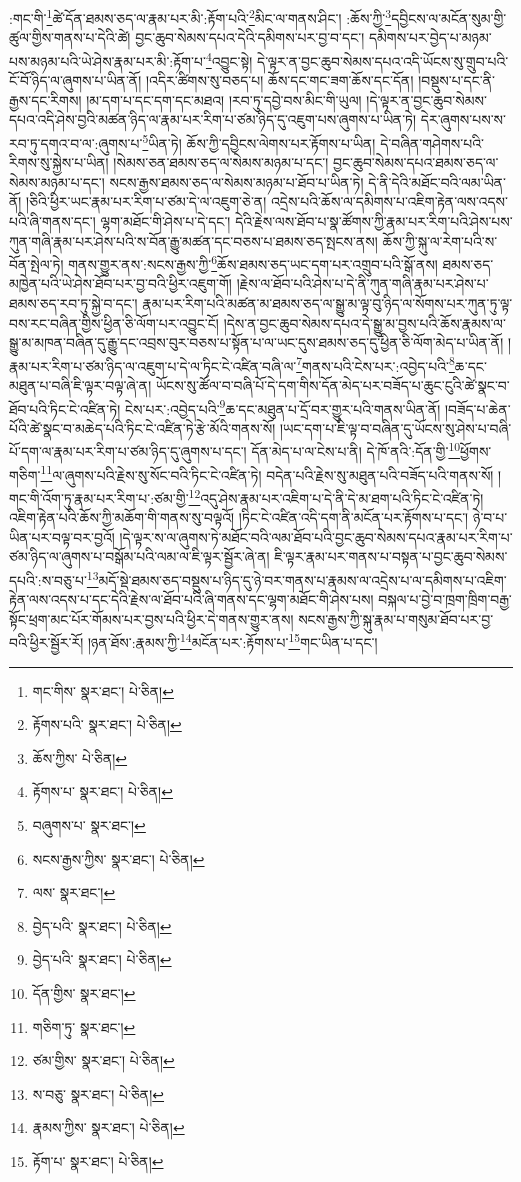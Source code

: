 :གང་གི་\footnote{གང་གིས་  སྣར་ཐང་།  པེ་ཅིན། }ཚེ་དོན་ཐམས་ཅད་ལ་རྣམ་པར་མི་:རྟོག་པའི་\footnote{རྟོགས་པའི་  སྣར་ཐང་།  པེ་ཅིན། }མིང་ལ་གནས་ཤིང་། :ཆོས་ཀྱི་\footnote{ཆོས་ཀྱིས་  པེ་ཅིན། }དབྱིངས་ལ་མངོན་སུམ་གྱི་ཚུལ་གྱིས་གནས་པ་དེའི་ཚེ། བྱང་ཆུབ་སེམས་དཔའ་དེའི་དམིགས་པར་བྱ་བ་དང་། དམིགས་པར་བྱེད་པ་མཉམ་པས་མཉམ་པའི་ཡེ་ཤེས་རྣམ་པར་མི་:རྟོག་པ་\footnote{རྟོགས་པ་  སྣར་ཐང་།  པེ་ཅིན། }འབྱུང་སྟེ། དེ་ལྟར་ན་བྱང་ཆུབ་སེམས་དཔའ་འདི་ཡོངས་སུ་གྲུབ་པའི་ངོ་བོ་ཉིད་ལ་ཞུགས་པ་ཡིན་ནོ། །འདིར་ཚིགས་སུ་བཅད་པ། ཆོས་དང་གང་ཟག་ཆོས་དང་དོན། །བསྡུས་པ་དང་ནི་རྒྱས་དང་རིགས། །མ་དག་པ་དང་དག་དང་མཐའ། །རབ་ཏུ་དབྱེ་བས་མིང་གི་ཡུལ། །དེ་ལྟར་ན་བྱང་ཆུབ་སེམས་དཔའ་འདི་ཤེས་བྱའི་མཚན་ཉིད་ལ་རྣམ་པར་རིག་པ་ཙམ་ཉིད་དུ་འཇུག་པས་ཞུགས་པ་ཡིན་ཏེ། དེར་ཞུགས་པས་ས་རབ་ཏུ་དགའ་བ་ལ་:ཞུགས་པ་\footnote{བཞུགས་པ་  སྣར་ཐང་། }ཡིན་ཏེ། ཆོས་ཀྱི་དབྱིངས་ལེགས་པར་རྟོགས་པ་ཡིན། དེ་བཞིན་གཤེགས་པའི་རིགས་སུ་སྐྱེས་པ་ཡིན། །སེམས་ཅན་ཐམས་ཅད་ལ་སེམས་མཉམ་པ་དང་། བྱང་ཆུབ་སེམས་དཔའ་ཐམས་ཅད་ལ་སེམས་མཉམ་པ་དང་། སངས་རྒྱས་ཐམས་ཅད་ལ་སེམས་མཉམ་པ་ཐོབ་པ་ཡིན་ཏེ། དེ་ནི་དེའི་མཐོང་བའི་ལམ་ཡིན་ནོ། །ཅིའི་ཕྱིར་ཡང་རྣམ་པར་རིག་པ་ཙམ་དེ་ལ་འཇུག་ཅེ་ན། འདྲེས་པའི་ཆོས་ལ་དམིགས་པ་འཇིག་རྟེན་ལས་འདས་པའི་ཞི་གནས་དང་། ལྷག་མཐོང་གི་ཤེས་པ་དེ་དང་། དེའི་རྗེས་ལས་ཐོབ་པ་སྣ་ཚོགས་ཀྱི་རྣམ་པར་རིག་པའི་ཤེས་པས་ཀུན་གཞི་རྣམ་པར་ཤེས་པའི་ས་བོན་རྒྱུ་མཚན་དང་བཅས་པ་ཐམས་ཅད་སྤངས་ནས། ཆོས་ཀྱི་སྐུ་ལ་རེག་པའི་ས་བོན་སྤེལ་ཏེ། གནས་གྱུར་ནས་:སངས་རྒྱས་ཀྱི་\footnote{སངས་རྒྱས་ཀྱིས་  སྣར་ཐང་།  པེ་ཅིན། }ཆོས་ཐམས་ཅད་ཡང་དག་པར་འགྲུབ་པའི་སྒོ་ནས། ཐམས་ཅད་མཁྱེན་པའི་ཡེ་ཤེས་ཐོབ་པར་བྱ་བའི་ཕྱིར་འཇུག་གོ། །རྗེས་ལ་ཐོབ་པའི་ཤེས་པ་དེ་ནི་ཀུན་གཞི་རྣམ་པར་ཤེས་པ་ཐམས་ཅད་རབ་ཏུ་སྐྱེ་བ་དང་། རྣམ་པར་རིག་པའི་མཚན་མ་ཐམས་ཅད་ལ་སྒྱུ་མ་ལྟ་བུ་ཉིད་ལ་སོགས་པར་ཀུན་ཏུ་ལྟ་བས་རང་བཞིན་གྱིས་ཕྱིན་ཅི་ལོག་པར་འབྱུང་ངོ། །དེས་ན་བྱང་ཆུབ་སེམས་དཔའ་དེ་སྒྱུ་མ་བྱས་པའི་ཆོས་རྣམས་ལ་སྒྱུ་མ་མཁན་བཞིན་དུ་རྒྱུ་དང་འབྲས་བུར་བཅས་པ་སྟོན་པ་ལ་ཡང་དུས་ཐམས་ཅད་དུ་ཕྱིན་ཅི་ལོག་མེད་པ་ཡིན་ནོ། །རྣམ་པར་རིག་པ་ཙམ་ཉིད་ལ་འཇུག་པ་དེ་ལ་ཏིང་ངེ་འཛིན་བཞི་ལ་\footnote{ལས་  སྣར་ཐང་། }གནས་པའི་ངེས་པར་:འབྱེད་པའི་\footnote{བྱེད་པའི་  སྣར་ཐང་།  པེ་ཅིན། }ཆ་དང་མཐུན་པ་བཞི་ཇི་ལྟར་བལྟ་ཞེ་ན། ཡོངས་སུ་ཚོལ་བ་བཞི་པོ་དེ་དག་གིས་དོན་མེད་པར་བཟོད་པ་ཆུང་ངུའི་ཚེ་སྣང་བ་ཐོབ་པའི་ཏིང་ངེ་འཛིན་ཏེ། ངེས་པར་:འབྱེད་པའི་\footnote{བྱེད་པའི་  སྣར་ཐང་།  པེ་ཅིན། }ཆ་དང་མཐུན་པ་དྲོ་བར་གྱུར་པའི་གནས་ཡིན་ནོ། །བཟོད་པ་ཆེན་པོའི་ཚེ་སྣང་བ་མཆེད་པའི་ཏིང་ངེ་འཛིན་ཏེ་རྩེ་མོའི་གནས་སོ། །ཡང་དག་པ་ཇི་ལྟ་བ་བཞིན་དུ་ཡོངས་སུ་ཤེས་པ་བཞི་པོ་དག་ལ་རྣམ་པར་རིག་པ་ཙམ་ཉིད་དུ་ཞུགས་པ་དང་། དོན་མེད་པ་ལ་ངེས་པ་ནི། དེ་ཁོ་ནའི་:དོན་གྱི་\footnote{དོན་གྱིས་  སྣར་ཐང་། }ཕྱོགས་གཅིག་\footnote{གཅིག་ཏུ་  སྣར་ཐང་། }ལ་ཞུགས་པའི་རྗེས་སུ་སོང་བའི་ཏིང་ངེ་འཛིན་ཏེ། བདེན་པའི་རྗེས་སུ་མཐུན་པའི་བཟོད་པའི་གནས་སོ། །གང་གི་འོག་ཏུ་རྣམ་པར་རིག་པ་:ཙམ་གྱི་\footnote{ཙམ་གྱིས་  སྣར་ཐང་།  པེ་ཅིན། }འདུ་ཤེས་རྣམ་པར་འཇིག་པ་དེ་ནི་དེ་མ་ཐག་པའི་ཏིང་ངེ་འཛིན་ཏེ། འཇིག་རྟེན་པའི་ཆོས་ཀྱི་མཆོག་གི་གནས་སུ་བལྟའོ། །ཏིང་ངེ་འཛིན་འདི་དག་ནི་མངོན་པར་རྟོགས་པ་དང་། ཉེ་བ་པ་ཡིན་པར་བལྟ་བར་བྱའོ། །དེ་ལྟར་ས་ལ་ཞུགས་ཏེ་མཐོང་བའི་ལམ་ཐོབ་པའི་བྱང་ཆུབ་སེམས་དཔའ་རྣམ་པར་རིག་པ་ཙམ་ཉིད་ལ་ཞུགས་པ་བསྒོམ་པའི་ལམ་ལ་ཇི་ལྟར་སྦྱོར་ཞེ་ན། ཇི་ལྟར་རྣམ་པར་གནས་པ་བསྟན་པ་བྱང་ཆུབ་སེམས་དཔའི་:ས་བཅུ་པ་\footnote{ས་བཅུ་  སྣར་ཐང་།  པེ་ཅིན། }མདོ་སྡེ་ཐམས་ཅད་བསྡུས་པ་ཉིད་དུ་ཉེ་བར་གནས་པ་རྣམས་ལ་འདྲེས་པ་ལ་དམིགས་པ་འཇིག་རྟེན་ལས་འདས་པ་དང་དེའི་རྗེས་ལ་ཐོབ་པའི་ཞི་གནས་དང་ལྷག་མཐོང་གི་ཤེས་པས། བསྐལ་པ་བྱེ་བ་ཁྲག་ཁྲིག་བརྒྱ་སྟོང་ཕྲག་མང་པོར་གོམས་པར་བྱས་པའི་ཕྱིར་དེ་གནས་གྱུར་ནས། སངས་རྒྱས་ཀྱི་སྐུ་རྣམ་པ་གསུམ་ཐོབ་པར་བྱ་བའི་ཕྱིར་སྦྱོར་རོ། །ཉན་ཐོས་:རྣམས་ཀྱི་\footnote{རྣམས་ཀྱིས་  སྣར་ཐང་།  པེ་ཅིན། }མངོན་པར་:རྟོགས་པ་\footnote{རྟོག་པ་  སྣར་ཐང་།  པེ་ཅིན། }གང་ཡིན་པ་དང་། 